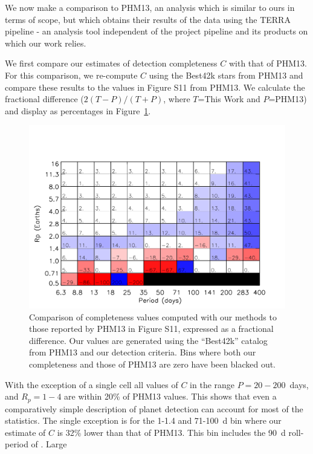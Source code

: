 We now make a comparison to PHM13, an analysis which
is similar to ours in terms of scope, but which obtains their results
of the \kep{} data using the TERRA pipeline \citep{Petigura2013} - an
analysis tool independent of the \kep{} project pipeline and its
products on which our work relies.  

We first compare our estimates of detection completeness $C$ with that
of PHM13.  For this comparison, we re-compute $C$ using the Best42k
stars from PHM13 and compare these results to the values in Figure S11
from PHM13.  We calculate the fractional difference ($2(T-P)/(T+P)$,
where $T$=This Work and $P$=PHM13) and display as percentages in
Figure~\ref{fig:comp_comp}.  
\begin{figure}[h]
\centerline{\includegraphics[scale=0.55]{chap2/Petigura_Sil_frac_completeness.pdf}}
\caption{Comparison of completeness values computed with our methods
  to those reported by PHM13 in Figure S11, expressed as a fractional
  difference.  Our values are generated using the ``Best42k'' catalog
  from PHM13 and our detection criteria.  Bins where both our
  completeness and those of PHM13 are zero have been blacked out.}
\label{fig:comp_comp}
\end{figure}
With the exception of a single cell all
values of $C$ in the range $P = 20-200$~days, and $R_p= 1-4$\rearth{}
are within 20\% of PHM13 values.  This shows that even a comparatively
simple description of \kep{} planet detection can account for most of
the statistics.  The single exception is for the 1-1.4\rearth{} and
71-100~d bin where our estimate of $C$ is 32\% lower than that of
PHM13.  This bin includes the 90~d roll-period of \kep{}.  Large
